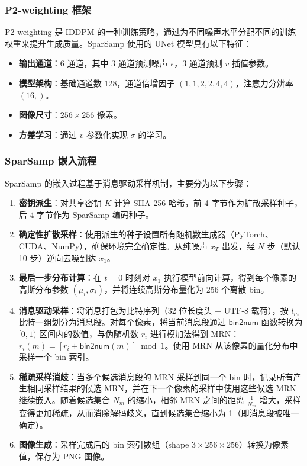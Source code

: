\subsubsection{P2-weighting 框架}

P2-weighting 是 IDDPM 的一种训练策略，通过为不同噪声水平分配不同的训练权重来提升生成质量。SparSamp 使用的 UNet 模型具有以下特征：

\begin{itemize}
    \item \textbf{输出通道}：6 通道，其中 3 通道预测噪声 $\epsilon$，3 通道预测 $v$ 插值参数。
    \item \textbf{模型架构}：基础通道数 128，通道倍增因子 $(1,1,2,2,4,4)$，注意力分辨率 $(16,)$。
    \item \textbf{图像尺寸}：$256 \times 256$ 像素。
    \item \textbf{方差学习}：通过 $v$ 参数化实现 $\sigma$ 的学习。
\end{itemize}

\subsubsection{SparSamp 嵌入流程}

SparSamp 的嵌入过程基于消息驱动采样机制，主要分为以下步骤：

\begin{enumerate}
    \item \textbf{密钥派生}：对共享密钥 $K$ 计算 SHA-256 哈希，前 4 字节作为扩散采样种子，后 4 字节作为 SparSamp 编码种子。
    \item \textbf{确定性扩散采样}：使用派生的种子设置所有随机数生成器（PyTorch、CUDA、NumPy），确保环境完全确定性。从纯噪声 $x_T$ 出发，经 $N$ 步（默认 10 步）逆向去噪到达 $x_1$。
    \item \textbf{最后一步分布计算}：在 $t=0$ 时刻对 $x_1$ 执行模型前向计算，得到每个像素的高斯分布参数 $(\mu_i, \sigma_i)$，并将连续高斯分布量化为 256 个离散 bin。
    \item \textbf{消息驱动采样}：将消息打包为比特序列（32 位长度头 + UTF-8 载荷），按 $l_m$ 比特一组划分为消息段。对每个像素，将当前消息段通过 $\textsf{bin2num}$ 函数转换为 $[0,1)$ 区间内的数值，与伪随机数 $r_i$ 进行模加法得到 MRN：$r_i(m) = [r_i + \textsf{bin2num}(m)] \bmod 1$。使用 MRN 从该像素的量化分布中采样一个 bin 索引。
    \item \textbf{稀疏采样消歧}：当多个候选消息段的 MRN 采样到同一个 bin 时，记录所有产生相同采样结果的候选 MRN，并在下一个像素的采样中使用这些候选 MRN 继续嵌入。随着候选集合 $N_m$ 的缩小，相邻 MRN 之间的距离 $\frac{1}{N_m}$ 增大，采样变得更加稀疏，从而消除解码歧义，直到候选集合缩小为 1（即消息段被唯一确定）。
    \item \textbf{图像生成}：采样完成后的 bin 索引数组（shape $3 \times 256 \times 256$）转换为像素值，保存为 PNG 图像。
\end{enumerate}

